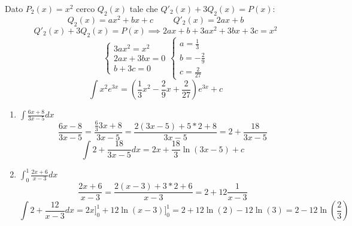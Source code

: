 \begin{exercise}
\begin{enumerate}
    Dato $P_2(x)=x^2$ cerco $Q_2(x)$ tale che $Q'_2(x)+3Q_2(x)=P(x)$:
    \begin{equation*}Q_2(x)=ax^2+bx+c\hspace{1cm}Q'_2(x)=2ax+b\end{equation*}
    \begin{equation*}Q'_2(x)+3Q_2(x)=P(x) \implies 2ax+b+3ax^2+3bx+3c=x^2\end{equation*}
    $$\begin{cases}3ax^2=x^2\\2ax+3bx=0\\b+3c=0\end{cases}\begin{cases}a=\frac{1}{3}\\b=-\frac{2}{9}\\c=\frac{2}{27}\end{cases}$$
    \begin{equation*}
        \int x^2e^{3x} = (\frac{1}{3}x^2-\frac{2}{9}x+\frac{2}{27})e^{3x}+c
    \end{equation*}
\end{enumerate}
\end{exercise}

\begin{exercise}\phantom{}
\begin{enumerate}
    \item $\int\frac{6x+8}{3x-5}dx$
    \begin{equation*}\frac{6x-8}{3x-5}=\frac{\frac{6}{3}3x+8}{3x-5}=\frac{2(3x-5)+5*2+8}{3x-5}=2+\frac{18}{3x-5}\end{equation*}
    \begin{equation*}\int 2+\frac{18}{3x-5}dx=2x+\frac{18}{3}\ln(3x-5)+c\end{equation*}
    
    \item $\int^1_0\frac{2x+6}{x-3}dx$
    \begin{equation*}\frac{2x+6}{x-3}=\frac{2(x-3)+3*2+6}{x-3}=2+12\frac{1}{x-3}\end{equation*}
    \begin{equation*}\int2+\frac{12}{x-3}dx=2x]^1_0+12\ln(x-3)]^1_0=2+12\ln(2)-12\ln(3)=2-12\ln(\frac{2}{3})\end{equation*}
\end{enumerate}
\end{exercise}

